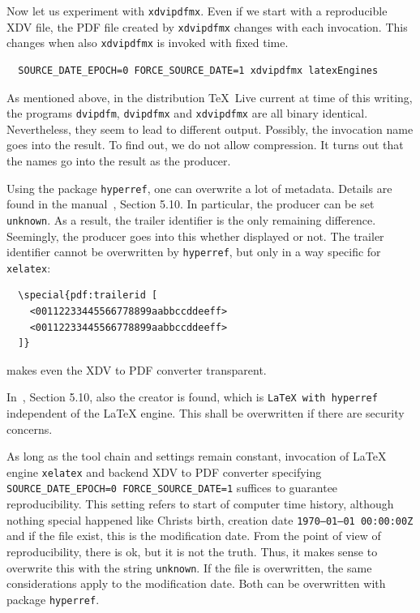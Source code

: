 \documentclass[a4paper]{article}%
\newcommand{\xelatex}{\texttt{xelatex}}
\newcommand{\texlive}{\TeX~Live}
\begin{document}
Now let us experiment with \texttt{xdvipdfmx}. 
Even if we start with a reproducible XDV file, 
the PDF file created by \texttt{xdvipdfmx} 
changes with each invocation. 
This changes when also \texttt{xdvipdfmx} is invoked with fixed time. 
%
\begin{verbatim}
  SOURCE_DATE_EPOCH=0 FORCE_SOURCE_DATE=1 xdvipdfmx latexEngines
\end{verbatim}

As mentioned above, in the distribution \texlive{} current at time of this writing, 
the programs \texttt{dvipdfm}, \texttt{dvipdfmx} and \texttt{xdvipdfmx} 
are all binary identical. 
Nevertheless, they seem to lead to different output. 
Possibly, the invocation name goes into the result. 
To find out, we do not allow compression. 
It turns out that the names go into the result as the producer. 

Using the package \texttt{hyperref}, 
one can overwrite a lot of metadata. 
Details are found in the manual~\cite{HyperTextP}, Section 5.10. 
In particular, the producer can be set \texttt{unknown}. 
As a result, the trailer identifier is the only remaining difference. 
Seemingly, the producer goes into this whether displayed or not. 
The trailer identifier cannot be overwritten by \texttt{hyperref}, 
but only in a way specific for \xelatex: 
%
\begin{verbatim}
  \special{pdf:trailerid [
    <00112233445566778899aabbccddeeff>
    <00112233445566778899aabbccddeeff>
  ]}  
\end{verbatim}
%
makes even the XDV to PDF converter transparent. 

In~\cite{HyperTextP}, Section 5.10, also the creator is found, 
which is \texttt{LaTeX with hyperref} independent of the \LaTeX{} engine. 
This shall be overwritten if there are security concerns. 

As long as the tool chain and settings remain constant, 
invocation of \LaTeX{} engine \xelatex{} and backend XDV to PDF converter 
specifying \texttt{SOURCE\_DATE\_EPOCH=0 FORCE\_SOURCE\_DATE=1} 
suffices to guarantee reproducibility. 
This setting refers to start of computer time history, 
although nothing special happened like Christs birth,
creation date \texttt{1970--01--01 00:00:00Z} 
and if the file exist, this is the modification date. 
From the point of view of reproducibility, 
there is ok, but it is not the truth. 
Thus, it makes sense to overwrite this with the string \texttt{unknown}. 
If the file is overwritten, the same considerations apply to the modification date. 
Both can be overwritten with package \texttt{hyperref}. 
\end{document}
